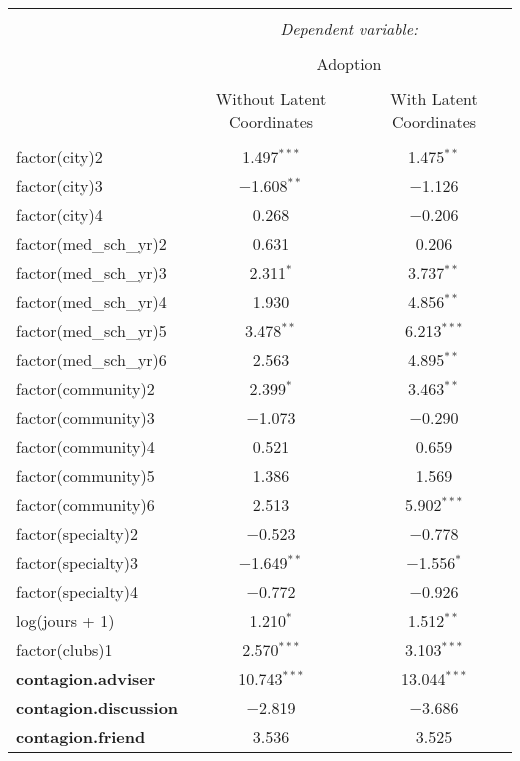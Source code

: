 \documentclass[11pt]{article}
\begin{document}
\begin{table}[!htbp] \centering 
  \caption{} 
  \label{} 
\begin{tabular}{@{\extracolsep{5pt}}lcc} 
\\[-1.8ex]\hline 
\hline \\[-1.8ex] 
 & \multicolumn{2}{c}{\textit{Dependent variable:}} \\ 
\cline{2-3} 
\\[-1.8ex] & \multicolumn{2}{c}{Adoption} \\ 
\\[-1.8ex] & Without Latent Coordinates & With Latent Coordinates\\ 
\hline \\[-1.8ex] 
 factor(city)2 & 1.497$^{***}$ & 1.475$^{**}$ \\ 
  factor(city)3 & $-$1.608$^{**}$ & $-$1.126 \\ 
  factor(city)4 & 0.268 & $-$0.206 \\ 
  factor(med\_sch\_yr)2 & 0.631 & 0.206 \\ 
  factor(med\_sch\_yr)3 & 2.311$^{*}$ & 3.737$^{**}$ \\ 
  factor(med\_sch\_yr)4 & 1.930 & 4.856$^{**}$ \\ 
  factor(med\_sch\_yr)5 & 3.478$^{**}$ & 6.213$^{***}$ \\ 
  factor(med\_sch\_yr)6 & 2.563 & 4.895$^{**}$ \\ 
  factor(community)2 & 2.399$^{*}$ & 3.463$^{**}$ \\ 
  factor(community)3 & $-$1.073 & $-$0.290 \\ 
  factor(community)4 & 0.521 & 0.659 \\ 
  factor(community)5 & 1.386 & 1.569 \\ 
  factor(community)6 & 2.513 & 5.902$^{***}$ \\ 
  factor(specialty)2 & $-$0.523 & $-$0.778 \\ 
  factor(specialty)3 & $-$1.649$^{**}$ & $-$1.556$^{*}$ \\ 
  factor(specialty)4 & $-$0.772 & $-$0.926 \\ 
  log(jours + 1) & 1.210$^{*}$ & 1.512$^{**}$ \\ 
  factor(clubs)1 & 2.570$^{***}$ & 3.103$^{***}$ \\ 
  \textbf{contagion.adviser} & 10.743$^{***}$ & 13.044$^{***}$ \\ 
  \textbf{contagion.discussion} & $-$2.819 & $-$3.686 \\ 
  \textbf{contagion.friend} & 3.536 & 3.525 \\ 

\end{tabular}
\end{table}
\end{document}
